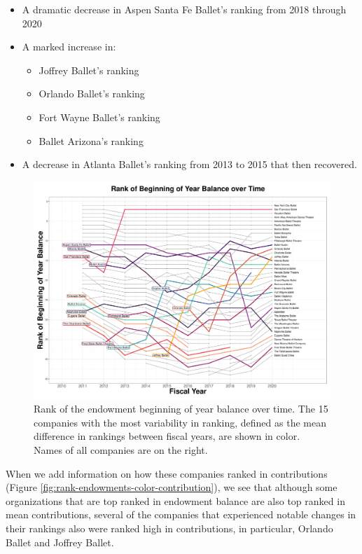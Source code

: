 \documentclass[Dance Data
Project,article,submit,moreauthors,pdftex]{mdpi}
\providecommand{\tightlist}{%
  \setlength{\itemsep}{0pt}\setlength{\parskip}{0pt}}
\begin{document}
\begin{itemize}
\tightlist
\item
  A dramatic decrease in Aspen Santa Fe Ballet's ranking from 2018
  through 2020
\item
  A marked increase in:

  \begin{itemize}
  \tightlist
  \item
    Joffrey Ballet's ranking
  \item
    Orlando Ballet's ranking
  \item
    Fort Wayne Ballet's ranking
  \item
    Ballet Arizona's ranking
  \end{itemize}
\item
  A decrease in Atlanta Ballet's ranking from 2013 to 2015 that then
  recovered.
\end{itemize}

\begin{figure}[H]
\includegraphics[width=0.9\linewidth,]{../images/rank_of_beginning_year_balance} \caption{\label{fig:rank-endowments}Rank of the endowment beginning of year balance over time. The 15 companies with the most variability in ranking, defined as the mean difference in rankings between fiscal years, are shown in color. Names of all companies are on the right.}\label{fig:rank-og-beginning-year-balance}
\end{figure}

When we add information on how these companies ranked in contributions
(Figure \ref{fig:rank-endowments-color-contribution}), we see that
although some organizations that are top ranked in endowment balance are
also top ranked in mean contributions, several of the companies that
experienced notable changes in their rankings also were ranked high in
contributions, in particular, Orlando Ballet and Joffrey Ballet.
\end{document}
